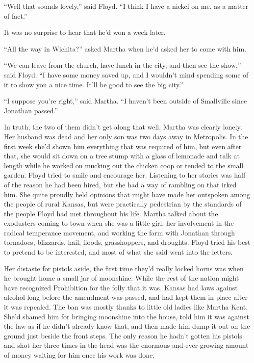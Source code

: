 ``Well that sounds lovely,'' said Floyd. ``I think I have a nickel on
me, as a matter of fact.''

It was no surprise to hear that he'd won a week later.

``All the way in Wichita?'' asked Martha when he'd asked her to come
with him.

``We can leave from the church, have lunch in the city, and then see the
show,'' said Floyd. ``I have some money saved up, and I wouldn't mind
spending some of it to show you a nice time. It'll be good to see the
big city.''

``I suppose you're right,'' said Martha. ``I haven't been outside of
Smallville since Jonathan passed.''

In truth, the two of them didn't get along that well. Martha was clearly
lonely. Her husband was dead and her only son was two days away in
Metropolis. In the first week she'd shown him everything that was
required of him, but even after that, she would sit down on a tree stump
with a glass of lemonade and talk at length while he worked on mucking
out the chicken coop or tended to the small garden. Floyd tried to smile
and encourage her. Listening to her stories was half of the reason he
had been hired, but she had a way of rambling on that irked him. She
quite proudly held opinions that might have made her outspoken among the
people of rural Kansas, but were practically pedestrian by the standards
of the people Floyd had met throughout his life. Martha talked about the
exodusters coming to town when she was a little girl, her involvement in
the radical temperance movement, and working the farm with Jonathan
through tornadoes, blizzards, hail, floods, grasshoppers, and droughts.
Floyd tried his best to pretend to be interested, and most of what she
said went into the letters.

Her distaste for pistols aside, the first time they'd really locked
horns was when he brought home a small jar of moonshine. While the rest
of the nation might have recognized Prohibition for the folly that it
was, Kansas had laws against alcohol long before the amendment was
passed, and had kept them in place after it was repealed. The ban was
mostly thanks to little old ladies like Martha Kent. She'd shamed him
for bringing moonshine into the house, told him it was against the law
as if he didn't already know that, and then made him dump it out on the
ground just beside the front steps. The only reason he hadn't gotten his
pistols and shot her three times in the head was the enormous and
ever‐growing amount of money waiting for him once his work was done.


